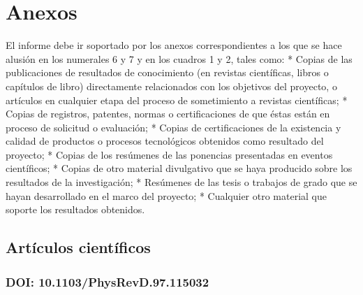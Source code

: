 \pagestyle{plain}
\newpage{}
\qquad

\newpage{}
\section{Anexos}
\begin{instrucciones}
  El informe debe ir soportado por los anexos correspondientes a los que se hace alusión en los numerales 6 y 7 y en los cuadros 1 y 2, tales como:
* Copias de las publicaciones de resultados de conocimiento (en revistas científicas, libros o capítulos de libro) directamente relacionados con los objetivos del proyecto, o artículos en cualquier etapa del proceso de sometimiento a revistas científicas; 
* Copias de registros, patentes, normas o certificaciones de que éstas están en proceso de solicitud o evaluación;
* Copias de certificaciones de la existencia y calidad de productos o procesos tecnológicos obtenidos como resultado del proyecto;
* Copias de los resúmenes de las ponencias presentadas en eventos científicos;
* Copias de otro material divulgativo que se haya producido sobre los resultados de la investigación;
* Resúmenes de las tesis o trabajos de grado que se hayan desarrollado en el marco del proyecto;
* Cualquier otro material que soporte los resultados obtenidos.
\end{instrucciones}



\subsection{Artículos científicos}
\label{sec:artic-cient}

\subsubsection{DOI: 10.1103/PhysRevD.97.115032~\cite{Reig:2018mdk}} 
\label{sec:physr1}

\newpage


\begin{includepdfs}%
  
\end{includepdfs}

\newpage{}



